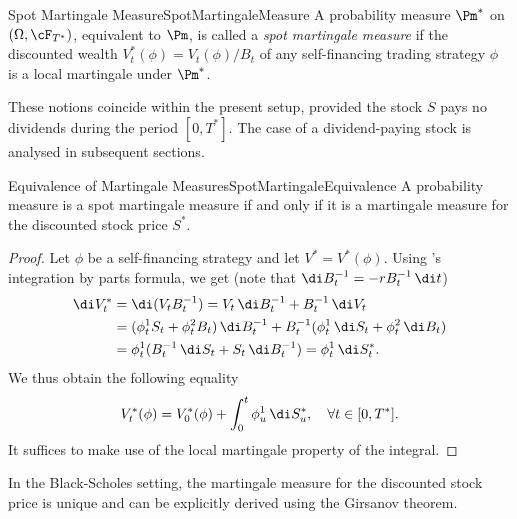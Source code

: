 \begin{defn}{Spot Martingale Measure}{SpotMartingaleMeasure}
	A probability measure $\Pm^*$ on $(\Omega, \cF_{T^*})$, equivalent to $\Pm$, is called a \textit{spot martingale measure} if the discounted wealth $V^*_t(\phi) = V_t(\phi)/B_t$ of any self-financing trading strategy $\phi$ is a local martingale under $\Pm^*$.
\end{defn}

These notions coincide within the present setup, provided the stock $S$ pays no dividends during the period $[0, T^*]$. The case of a dividend-paying stock is analysed in subsequent sections.

\begin{lem}{Equivalence of Martingale Measures}{SpotMartingaleEquivalence}
	A probability measure is a spot martingale measure if and only if it is a martingale measure for the discounted stock price $S^*$.
\end{lem}

\begin{proof}
	Let $\phi$ be a self-financing strategy and let $V^* = V^*(\phi)$. Using \Ito's integration by parts formula, we get (note that $\di B_t^{-1} = -r B_t^{-1} \, \di t$)
	\begin{equation*}
		\begin{aligned}
			\di V^*_t & = \di(V_t B_t^{-1}) = V_t \, \di B_t^{-1} + B_t^{-1} \, \di V_t                                        \\
			          & = (\phi^1_t S_t + \phi^2_t B_t) \, \di B_t^{-1} + B_t^{-1} (\phi^1_t \, \di S_t + \phi^2_t \, \di B_t) \\
			          & = \phi^1_t (B_t^{-1} \, \di S_t + S_t \, \di B_t^{-1}) = \phi^1_t \, \di S^*_t.
		\end{aligned}
	\end{equation*}
	We thus obtain the following equality
	\begin{equation*}
		V^*_t(\phi) = V^*_0(\phi) + \int_0^t \phi^1_u \, \di S^*_u, \quad \forall t \in [0, T^*].
	\end{equation*}
	It suffices to make use of the local martingale property of the \Ito{} integral.
\end{proof}

In the Black-Scholes setting, the martingale measure for the discounted stock price is unique and can be explicitly derived using the Girsanov theorem.

